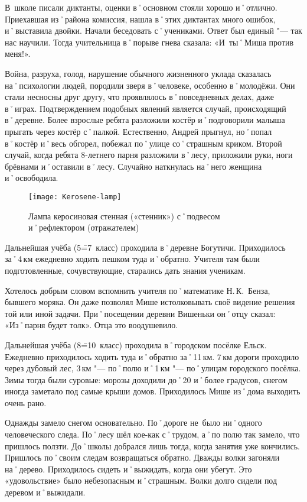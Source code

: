 В~школе писали диктанты, оценки в˚основном стояли хорошо и˚отлично. Приехавшая из˚района комиссия, нашла в˚этих диктантах много ошибок, и˚выставила двойки. Начали беседовать с˚учениками. Ответ был единый "--- так нас научили. Тогда учительница в˚порыве гнева сказала: «И~ты˚Миша против меня!».

Война, разруха, голод, нарушение обычного жизненного уклада сказалась на˚психологии людей, породили зверя в˚человеке, особенно в˚молодёжи. Они стали несносны друг другу, что проявлялось в˚повседневных делах, даже в˚играх. Подтверждением подобных явлений является случай, происходящий в˚деревне. Более взрослые ребята разложили костёр и˚подговорили малыша прыгать через костёр с˚палкой. Естественно, Андрей прыгнул, но˚попал в˚костёр и˚весь обгорел, побежал по˚улице со˚страшным криком. Второй случай, когда ребята 8-летнего парня разложили в˚лесу, приложили руки, ноги брёвнами и˚оставили в˚лесу. Случайно наткнулась на˚него женщина и˚освободила.

\begin{wrapfigure}{O}{.25\textwidth}
\centering
\texttt{[image: Kerosene-lamp]}
\caption[Лампа керосиновая стенная («стенник») с˚подвесом и˚рефлектором (отражателем)]{Лампа керосиновая стенная («стенник») с˚подвесом и˚рефлектором (отражателем)\footnotemark}
\label{fig:Kerosene-lamp}
\end{wrapfigure}

Дальнейшая учёба (5\==7~класс) проходила в˚деревне Богутичи. Приходилось за˚4\,км ежедневно ходить пешком туда и˚обратно. Учителя там были подготовленные, сочувствующие, старались дать знания ученикам. 

Хотелось добрым словом вспомнить учителя по˚математике Н.\,К.~Бенза, бывшего моряка. Он даже позволял Мише истолковывать своё видение решения той или иной задачи. При˚посещении деревни Вишеньки он˚отцу сказал: «Из˚парня будет толк». Отца это воодушевило.

Дальнейшая учёба (8\==10~класс) проходила в˚городском посёлке Ельск. Ежедневно приходилось ходить туда и˚обратно за˚11\,км. 7\,км дороги проходило через дубовый лес, 3\,км "--- по˚полю и˚1\,км "--- по˚улицам городского посёлка. Зимы тогда были суровые: морозы доходили до˚20 и˚более градусов, снегом иногда заметало под самые крыши домов. Приходилось Мише из˚дома выходить очень рано. 

Однажды замело снегом основательно. По˚дороге не~было ни˚одного человеческого следа. По˚лесу шёл кое-как с˚трудом, а˚по полю так замело, что пришлось ползти. До˚школы добрался лишь тогда, когда занятия уже кончились. Пришлось по˚своим следам возвращаться обратно. Дважды волки загоняли на˚дерево. Приходилось сидеть и˚выжидать, когда они убегут. Это «удовольствие» было небезопасным и˚страшным. Волки долго сидели под деревом и˚выжидали.


